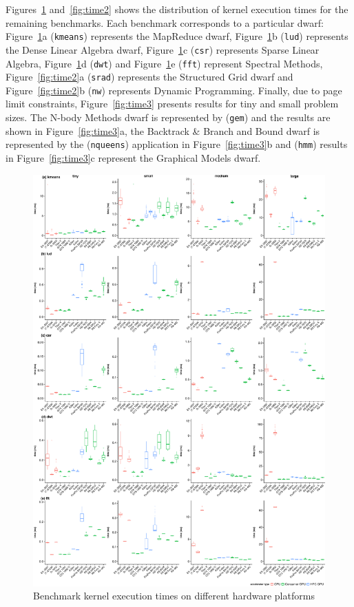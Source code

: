 \documentclass[../document.tex]{subfiles}
\begin{document}
Figures~\ref{fig:time} and~\ref{fig:time2} shows the distribution of kernel execution times for the remaining benchmarks.
Each benchmark corresponds to a particular dwarf: 
Figure~\ref{fig:time}a ({\tt kmeans}) represents the MapReduce dwarf,
Figure~\ref{fig:time}b ({\tt lud}) represents the Dense Linear Algebra dwarf,
Figure~\ref{fig:time}c ({\tt csr}) represents Sparse Linear Algebra, 
Figure~\ref{fig:time}d ({\tt dwt}) and Figure~\ref{fig:time}e ({\tt fft}) represent Spectral Methods,
Figure~\ref{fig:time2}a ({\tt srad}) represents the Structured Grid dwarf and Figure~\ref{fig:time2}b ({\tt nw}) represents Dynamic Programming.
Finally, due to page limit constraints, Figure~\ref{fig:time3} presents results for tiny and small problem sizes.
The N-body Methods dwarf is represented by ({\tt gem}) and the results are shown in Figure~\ref{fig:time3}a, the Backtrack \& Branch and Bound dwarf is represented by the ({\tt nqueens}) application in Figure~\ref{fig:time3}b and ({\tt hmm}) results in Figure~\ref{fig:time3}c represent the Graphical Models dwarf.


\begin{figure}
    \centering
    \includegraphics[width=.9\textwidth,keepaspectratio]{figures/new-time-results/generate_main_4x5_bandwplot}
    \caption{Benchmark kernel execution times on different hardware platforms}
    \label{fig:time}
\end{figure}
\end{document}
